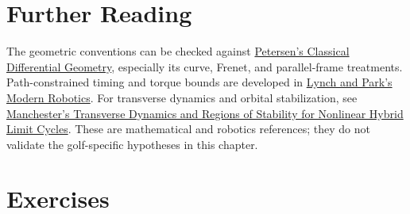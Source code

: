\section{Further Reading}

The geometric conventions can be checked against
\href{https://www.math.ucla.edu/~petersen/DGnotes.pdf}{Petersen's Classical
Differential Geometry}, especially its curve, Frenet, and parallel-frame
treatments. Path-constrained timing and torque bounds are developed in
\href{https://modernrobotics.northwestern.edu/nu-gm-book-resource/9-4-time-optimal-time-scaling-part-1-of-3/}{Lynch and Park's Modern Robotics}.
For transverse dynamics and orbital stabilization, see
\href{https://arxiv.org/abs/1010.2241}{Manchester's Transverse Dynamics and
Regions of Stability for Nonlinear Hybrid Limit Cycles}. These are
mathematical and robotics references; they do not validate the golf-specific
hypotheses in this chapter.

\section{Exercises}

